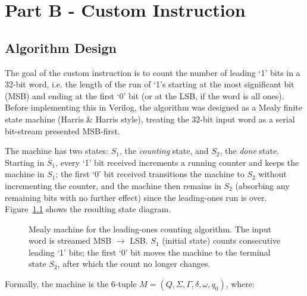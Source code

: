 \documentclass[
    12pt,
    a4paper
]{report}
\begin{document}
\chapter{Part B - Custom Instruction}

\section{Algorithm Design}

The goal of the custom instruction is to count the number of leading `1' bits in a 32-bit word,
i.e. the length of the run of `1's starting at the most significant bit (MSB) and ending at the
first `0' bit (or at the LSB, if the word is all ones). Before implementing this in Verilog, the
algorithm was designed as a Mealy finite state machine (Harris \& Harris style), treating the
32-bit input word as a serial bit-stream presented MSB-first.

The machine has two states: $S_1$, the \emph{counting} state, and $S_2$, the \emph{done} state.
Starting in $S_1$, every `1' bit received increments a running counter and keeps the machine in
$S_1$; the first `0' bit received transitions the machine to $S_2$ without incrementing the
counter, and the machine then remains in $S_2$ (absorbing any remaining bits with no further
effect) since the leading-ones run is over. Figure~\ref{fig:fsm} shows the resulting state
diagram.

\begin{figure}[H]
    \centering
    \caption{Mealy machine for the leading-ones counting algorithm. The input word is streamed
    MSB $\rightarrow$ LSB. $S_1$ (initial state) counts consecutive leading `1' bits; the first
    `0' bit moves the machine to the terminal state $S_2$, after which the count no longer
    changes.}
    \label{fig:fsm}
\end{figure}

Formally, the machine is the 6-tuple $M = (Q, \Sigma, \Gamma, \delta, \omega, q_0)$, where:
\end{document}
